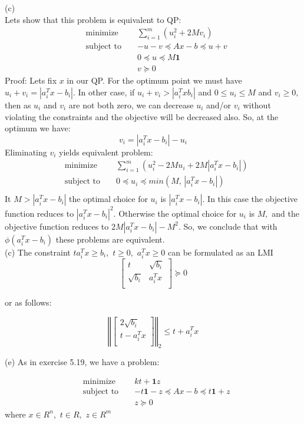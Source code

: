 \documentclass{article}
\begin{document}
(c)\\
Lets show that this problem is equivalent to QP:
\begin{align*}
&\text{minimize } && 
\sum_{i = 1}^m(u_i^2 + 2 M v_i) \\
&\text{subject to } && 
-u - v \preceq Ax - b \preceq u + v\\
& && 0 \preceq u \preceq M \boldsymbol{1}\\
& && v \succeq 0
\end{align*}
Proof: Lets fix $x$ in our QP. For the optimum point we must have \\
$u_i + v_i = |a_i^T x - b_i|.$
In other case, if 
$u_i + v_i > |a_i^T x b_i|$ and 
$0 \leq u_i \leq M$ and $v_i \geq 0, $ then as $u_i$ and $v_i$ are not both zero, we can decrease $u_i$ and/or $v_i$ without violating the constraints and the objective will be decreased also. So, at the optimum we have:
$$ v_i = |a_i^T x - b_i| - u_i$$ 
Eliminating $v_i$ yields equivalent problem:
\begin{align*}
&\text{minimize } && 
\sum_{i = 1}^m
(u_i^2 - 2 M u_i + 2 M |a_i^T x - b_i|) \\
&\text{subject to }
&& 0 \preceq u_i \preceq 
min(M, \, |a_i^T x - b_i|)\\
\end{align*}
It $M > |a_i^T x - b_i|$ the optimal choice for 
$u_i$ is $|a_i^T x - b_i|.$ In this case the objective function reduces to 
$|a_i^T x - b_i|^2.$ Otherwise the optimal choice for $u_i$ is $M,$ and the objective function reduces to $2 M |a_i^T x - b_i| - M^2.$ So, we conclude that with $\phi(a_i^T x - b_i)$ these problems are equivalent.\\
(c) The constraint $ta_i^Tx \geq b_i,$ $t \geq 0,$
$a_i^T x \geq 0$ can be formulated as an LMI 
$$
\begin{bmatrix}
	t & \sqrt{b_i}\\
	\sqrt{b_i} & a_i^Tx\\
\end{bmatrix} \succeq 0
$$

or as follows:

$$
\left\Vert
\begin{bmatrix}
 2\sqrt{b_i}\\
t - a_i^Tx\\
\end{bmatrix} 
\right\Vert_2 \leq t + a_i^Tx
$$

(e) As in exercise 5.19, we have a problem:

\begin{align*}
&\text{minimize } && 
kt + \boldsymbol{1}z \\
&\text{subject to }
&& - t \boldsymbol{1} - z \preceq Ax - b \preceq 
t \boldsymbol{1} +z \\
& && z \succeq 0
\end{align*}
where $x \in R^n,$ $t \in R,$ $z \in R^m$
\end{document}
